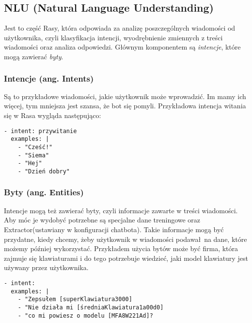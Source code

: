 \documentclass{article}
\begin{document}
\subsection{NLU (Natural Language Understanding)}
Jest to część Rasy, która odpowiada za analizę poszczególnych wiadomości od 
użytkownika, czyli klasyfikacja intencji, wyodrębnienie zmiennych z treści
wiadomości oraz analiza odpowiedzi. Głównym komponentem są \emph{intencje},
które mogą zawierać \emph{byty}.

\subsubsection{Intencje (ang. Intents)}
Są to przykładowe wiadomości, jakie użytkownik może wprowadzić. Im mamy ich
więcej, tym mniejsza jest szansa, że bot się pomyli. Przykładowa intencja
witania się w Rasa wygląda następująco:

\begin{lstlisting}[caption=Przykładowa intencja]
- intent: przywitanie
  examples: |
    - "Cześć!"
    - "Siema"
    - "Hej"
    - "Dzień dobry"
\end{lstlisting}

\subsubsection{Byty (ang. Entities)}
Intencje mogą też zawierać byty, czyli informacje zawarte w treści wiadomości.
Aby móc je wydobyć potrzebne są specjalne dane treningowe oraz
Extractor(ustawiany w konfiguracji chatbota). Takie informacje mogą być
przydatne, kiedy chcemy, żeby użytkownik w wiadomości podawał na dane, które
możemy później wykorzystać. Przykładem użycia bytów może być firma, która
zajmuje się klawiaturami i do tego potrzebuje wiedzieć, jaki model klawiatury
jest używany przez użytkownika.

\begin{lstlisting}[caption=Przykładowa intencja z użyciem bytów]
- intent: 
  examples: |
    - "Zepsułem [superKlawiatura3000]
    - "Nie działa mi [średniaKlawiatura1a00d0]
    - "co mi powiesz o modelu [MFA8W221Ad]?
\end{lstlisting}
\end{document}
